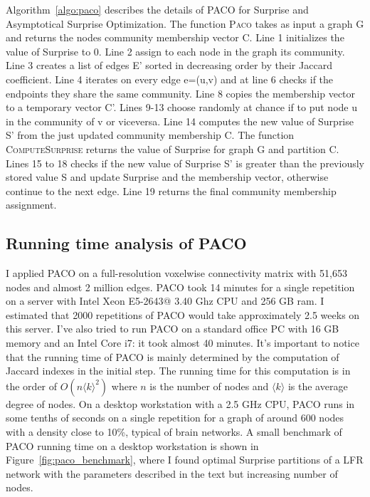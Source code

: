 Algorithm~\ref{algo:paco} describes the details of PACO for Surprise and Asymptotical Surprise Optimization.
The function \textsc{Paco} takes as input a graph G and returns the nodes community membership vector C.
Line 1 initializes the value of Surprise to 0.
Line 2 assign to each node in the graph its community.
Line 3 creates a list of edges E' sorted in decreasing order by their Jaccard coefficient.
Line 4 iterates on every edge e=(u,v) and at line 6 checks if the endpoints they share the same community.
Line 8 copies the membership vector to a temporary vector C'.
Lines 9-13 choose randomly at chance if to put node u in the community of v or viceversa.
Line 14 computes the new value of Surprise S' from the just updated community membership C.
The function \textsc{ComputeSurprise} returns the value of Surprise for graph G and partition C.
Lines 15 to 18 checks if the new value of Surprise S' is greater than the previously stored value S and update Surprise and the membership vector, otherwise continue to the next edge.
Line 19 returns the final community membership assignment.




\subsection{Running time analysis of PACO}
I applied PACO on a full-resolution voxelwise connectivity matrix with 51,653 nodes and almost 2 million edges.
PACO took 14 minutes for a single repetition on a server with Intel Xeon E5-2643@ 3.40 Ghz CPU and 256 GB ram.
I estimated that 2000 repetitions of PACO would take approximately 2.5 weeks on this server.
I've also tried to run PACO on a standard office PC with 16 GB memory and an Intel Core i7: it took almost 40 minutes.
It's important to notice that the running time of PACO is mainly determined by the computation of Jaccard indexes in the initial step.
The running time for this computation is in the order of $O(n\langle k \rangle^2)$ where $n$ is the number of nodes and $\langle k \rangle$ is the average degree of nodes.
On a desktop workstation with a 2.5 GHz CPU, PACO runs in some tenths of seconds on a single repetition for a graph of around 600 nodes with a density close to 10\%, typical of brain networks.
A small benchmark of PACO running time on a desktop workstation is shown in Figure~\ref{fig:paco_benchmark}, where I found optimal Surprise partitions of a LFR network with the parameters described in the text but increasing number of nodes.

